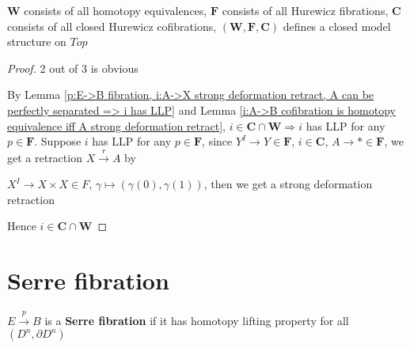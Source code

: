 \documentclass[main]{subfiles}
\begin{document}
\begin{theorem}
$\mathbf{W}$ consists of all homotopy equivalences, $\mathbf{F}$ consists of all Hurewicz fibrations, $\mathbf{C}$ consists of all closed Hurewicz cofibrations, $(\mathbf{W},\mathbf{F},\mathbf{C})$ defines a closed model structure on $Top$
\end{theorem}

\begin{proof}
2 out of 3 is obvious \par
By Lemma \ref{p:E->B fibration, i:A->X strong deformation retract, A can be perfectly separated => i has LLP} and Lemma \ref{i:A->B cofibration is homotopy equivalence iff A strong deformation retract}, $i\in\mathbf{C}\cap\mathbf{W}\Rightarrow i$ has LLP for any $p\in\mathbf{F}$. Suppose $i$ has LLP for any $p\in\mathbf F$, since $Y^I\to Y\in\mathbf F$, $i\in\mathbf C$, $A\to*\in \mathbf F$, we get a retraction $X\xrightarrow rA$ by
\begin{center}
\end{center}
$X^I\to X\times X\in F$, $\gamma\mapsto(\gamma(0),\gamma(1))$, then we get a strong deformation retraction
\begin{center}
\end{center}
Hence $i\in\mathbf C\cap\mathbf W$
\end{proof}



\section{Serre fibration}

\begin{definition}
$E\xrightarrow p B$ is a \textbf{Serre fibration} if it has homotopy lifting property for all $(D^n,\partial D^n)$
\end{definition}
\end{document}
